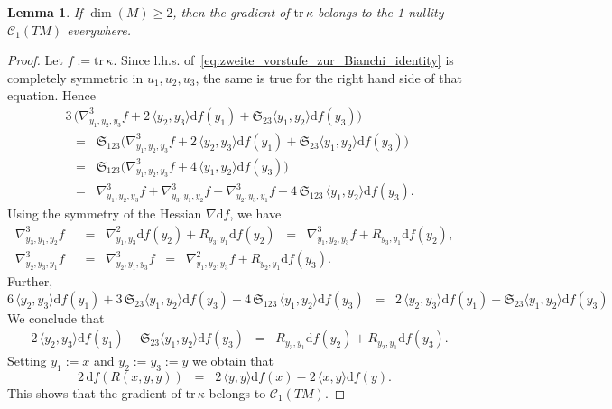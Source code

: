 \documentclass[11pt,a4paper]{article}
\theoremstyle{plain}
\newtheorem{lemma}{Lemma}
\theoremstyle{remark}
\newcommand{\cyclic}{\mathfrak{S}}
\renewcommand{\d}{\mathrm{d}}
\newcommand{\trace}{\mathrm{tr}}
\newcommand{\scrC}{\mathcal{C}}
\begin{document}
\bigskip
\begin{lemma}\label{le:curvature_constancy}
If $\dim(M) \geq  2$, then the gradient of $\trace \, \kappa$ belongs to the 1-nullity $\scrC_1(TM)$ everywhere.
\end{lemma}
\begin{proof}
Let $f := \trace \, \kappa$. Since l.h.s. of~\eqref{eq:zweite_vorstufe_zur_Bianchi_identity} is completely
symmetric in $u_1,u_2,u_3$, the same is true for the right hand side of that
equation. Hence
\begin{align*}
& 3\, \big (\nabla^3_{y_1,y_2,y_3}f + 2\, \langle y_2,y_3\rangle \d f(y_1)
+ \cyclic_{23}\langle y_1,y_2\rangle \d f(y_3) \big )\\
&\;\;=\;\; \cyclic_{123} \big (\nabla^3_{y_1,y_2,y_3}f + 2\, \langle y_2,y_3\rangle \d f(y_1)
+ \cyclic_{23}\langle y_1,y_2\rangle  \d f(y_3) \big )\\
&\;\;=\;\;\cyclic_{123}\big (\nabla^3_{y_1,y_2,y_3}f +  4\,\langle y_1,y_2\rangle  \d f(y_3)\big )\\
&\;\;=\;\;\nabla^3_{y_1,y_2,y_3}f + \nabla^3_{y_3,y_1,y_2}f + \nabla^3_{y_2,y_3,y_1}f  + 4\,\cyclic_{123}\,\langle y_1,y_2\rangle \d f(y_3).
\end{align*}
Using the symmetry of the Hessian $\nabla\d f$, we have
\begin{align*}
 \nabla^3_{y_3,y_1,y_2}f &\;\;=\;\;\nabla^2_{y_1,y_3}\d f(y_2) + R_{y_3,y_1} \d f(y_2)\;\;=\;\;\nabla^3_{y_1,y_2,y_3}f + R_{y_3,y_1} \d f(y_2),\\
 \nabla^3_{y_2,y_3,y_1}f &\;\;=\;\; \nabla^3_{y_2,y_1,y_3}f\;\;=\;\;\nabla^2_{y_1,y_2,y_3}f + R_{y_2,y_1} \d f(y_3).
\end{align*}
Further,
\begin{equation*}
 6\, \langle y_2,y_3\rangle \d f(y_1)
+ 3\,\cyclic_{23}\langle y_1,y_2\rangle \d f(y_3) - 4\,\cyclic_{123}\,\langle y_1,y_2\rangle \d f(y_3)\;\;=\;\;2\, \langle y_2,y_3\rangle
\d f(y_1) - \cyclic_{23}\langle y_1,y_2\rangle \d f(y_3)
\end{equation*}
We conclude that
\begin{align*}
& 2\, \langle y_2,y_3\rangle
\d f(y_1) - \cyclic_{23}\langle y_1,y_2\rangle  \d f(y_3)
\;\;=\;\;R_{y_3,y_1}  \d f(y_2) + R_{y_2,y_1} \d f(y_3) .
\end{align*}
Setting $y_1 := x$ and $y_2 := y_3 := y$ we obtain that
\begin{equation*}
2\, \d f(R(x,y,y))\;\;=\;\;2\, \langle y,y\rangle
\d f(x) - 2\, \langle x,y\rangle \d f(y).
\end{equation*}
This shows that the gradient of  $\trace \, \kappa$ belongs to $\scrC_1(TM)$.
\end{proof}
\end{document}
